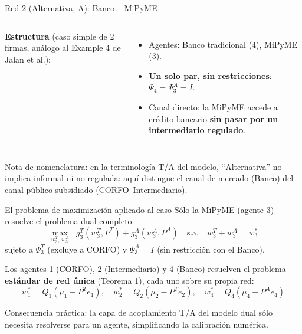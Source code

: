 \documentclass[aspectratio=169]{beamer}
\begin{document}
\begin{frame}{Red 2 (Alternativa, A): Banco -- MiPyME}
\begin{columns}[T]
    \textbf{Estructura} (caso simple de 2 firmas, análogo al Example 4 de Jalan et al.):
    \begin{itemize}
        \item Agentes: Banco tradicional (4), MiPyME (3).
        \item \textbf{Un solo par, sin restricciones}: $\Psi_4=\Psi_3^A=I$.
        \item Canal directo: la MiPyME accede a crédito bancario \textbf{sin pasar por un intermediario regulado}.
    \end{itemize}
    \centering
\end{columns}

\vspace{0.4cm}
\footnotesize{Nota de nomenclatura: en la terminología T/A del modelo, ``Alternativa'' no implica informal ni no regulada: aquí distingue el canal de mercado (Banco) del canal público-subsidiado (CORFO--Intermediario).}
\end{frame}

\begin{frame}{El problema de maximización aplicado al caso}
Sólo la MiPyME (agente 3) resuelve el problema dual completo:
\begin{equation}
\max_{w_3^T,\, w_3^A} \;\; g_3^T(w_3^T, P^T) + g_3^A(w_3^A, P^A) \quad \text{s.a.} \quad w_3^T + w_3^A = w_3^*
\end{equation}
sujeto a $\Psi_3^T$ (excluye a CORFO) y $\Psi_3^A=I$ (sin restricción con el Banco).

\vspace{0.3cm}
Los agentes 1 (CORFO), 2 (Intermediario) y 4 (Banco) resuelven el problema \textbf{estándar de red única} (Teorema 1), cada uno sobre su propia red:
$$w_1^* = Q_1(\mu_1-P^Te_1), \quad w_2^*=Q_2(\mu_2-P^Te_2), \quad w_4^*=Q_4(\mu_4-P^Ae_4)$$

\vspace{0.2cm}
\footnotesize{Consecuencia práctica: la capa de acoplamiento T/A del modelo dual sólo necesita resolverse para un agente, simplificando la calibración numérica.}
\end{frame}
\end{document}
